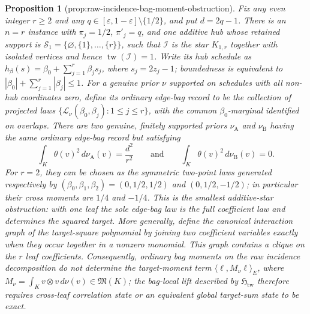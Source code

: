 \documentclass{article}
\newtheorem{proposition}{Proposition}
\begin{document}
\begin{proposition}[prop:raw-incidence-bag-moment-obstruction]\label{prop:raw-incidence-bag-moment-obstruction}
Fix any even integer \(r\ge 2\) and any \(q\in[\varepsilon,1-\varepsilon]\setminus\{1/2\}\), and put \(d=2q-1\).  There is an \(n=r\) instance with \(\pi_j=1/2\), \(\pi'_j=q\), and one additive hub whose retained support is \(\mathcal S_1=\{\varnothing,\{1\},\ldots,\{r\}\}\), such that \(\mathcal I\) is the star \(K_{1,r}\) together with isolated vertices and hence \(\operatorname{tw}(\mathcal I)=1\).  Write its hub schedule as \(h_\beta(s)=\beta_0+\sum_{j=1}^r\beta_js_j\), where \(s_j=2z_j-1\); boundedness is equivalent to \(|\beta_0|+\sum_{j=1}^r|\beta_j|\le1\).  For a genuine prior \(\nu\) supported on schedules with all non-hub coordinates zero, define its ordinary edge-bag record to be the collection of projected laws \(\{\mathcal L_\nu(\beta_0,\beta_j):1\le j\le r\}\), with the common \(\beta_0\)-marginal identified on overlaps.  There are two genuine, finitely supported priors \(\nu_{\mathrm A}\) and \(\nu_{\mathrm B}\) having the same ordinary edge-bag record but satisfying
\[
 \int_K\theta(v)^2\,d\nu_{\mathrm A}(v)=\frac{d^2}{r^2}
 \qquad\text{and}\qquad
 \int_K\theta(v)^2\,d\nu_{\mathrm B}(v)=0.
\]
For \(r=2\), they can be chosen as the symmetric two-point laws generated respectively by \((\beta_0,\beta_1,\beta_2)=(0,1/2,1/2)\) and \((0,1/2,-1/2)\); in particular their cross moments are \(1/4\) and \(-1/4\).  This is the smallest additive-star obstruction: with one leaf the sole edge-bag law is the full coefficient law and determines the squared target.  More generally, define the canonical interaction graph of the target-square polynomial by joining two coefficient variables exactly when they occur together in a nonzero monomial.  This graph contains a clique on the \(r\) leaf coefficients.  Consequently, ordinary bag moments on the raw incidence decomposition do not determine the target-moment term \(\langle\ell,M_\nu\ell\rangle_E\), where \(M_\nu=\int_K v\otimes v\,d\nu(v)\in\mathfrak M(K)\); the bag-local lift described by \(\mathfrak H_{\mathrm{tw}}\) therefore requires cross-leaf correlation state or an equivalent global target-sum state to be exact.
\end{proposition}
\end{document}
